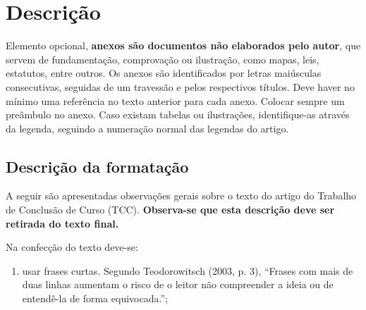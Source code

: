\clearpage
\setcounter{section}{0}
\renewcommand{\thesection}{Anexo \Alph{section}}
\section{Descrição}\label{sec:anexo-descricao}

Elemento opcional, \textbf{anexos são documentos não elaborados pelo
autor}, que servem de fundamentação, comprovação ou ilustração, como
mapas, leis, estatutos, entre outros. Os anexos são identificados por
letras maiúsculas consecutivas, seguidas de um travessão e pelos
respectivos títulos. Deve haver no mínimo uma referência no texto
anterior para cada anexo. Colocar sempre um preâmbulo no anexo. Caso
existam tabelas ou ilustrações, identifique-as através da legenda,
seguindo a numeração normal das legendas do artigo.

\subsection{Descrição da formatação}\label{subsec:descricao-formatacao}

A seguir são apresentadas observações gerais sobre o texto do artigo do
Trabalho de Conclusão de Curso (TCC). \textbf{Observa-se que esta
descrição deve ser retirada do texto final.}

Na confecção do texto deve-se:

\begin{enumerate}
\def\labelenumi{\alph{enumi})}
\item
  usar frases curtas. Segundo Teodorowitsch (2003, p. 3), ``Frases com
  mais de duas linhas aumentam o risco de o leitor não compreender a
  ideia ou de entendê-la de forma equivocada.'';
\end{enumerate}

